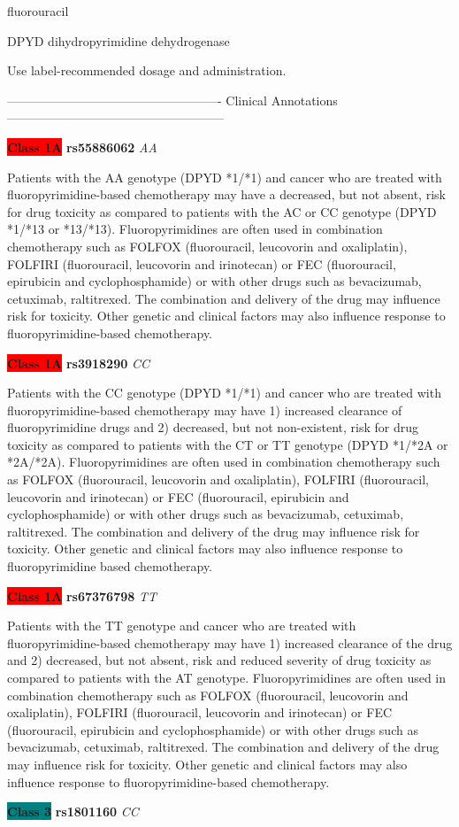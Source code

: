 \documentclass{resume} %
\begin{document}
\begin{rSection}{ fluorouracil }
\begin{rSubsection}{ DPYD }{ dihydropyrimidine dehydrogenase }{}{}
\item[] Use label-recommended dosage and administration.
\item[] ---------------------------------------------------- Clinical Annotations -----------------------------------------------------\newline
\item \textbf{\colorbox{red} {Class 1A}} \textbf{ rs55886062 } \textit{ AA }
\item[] Patients with the AA genotype (DPYD *1/*1) and cancer who are treated with fluoropyrimidine-based chemotherapy may have a decreased, but not absent, risk for drug toxicity as compared to patients with the AC or CC genotype (DPYD *1/*13 or *13/*13). Fluoropyrimidines are often used in combination chemotherapy such as FOLFOX (fluorouracil, leucovorin and oxaliplatin), FOLFIRI (fluorouracil, leucovorin and irinotecan) or FEC (fluorouracil, epirubicin and cyclophosphamide) or with other drugs such as bevacizumab, cetuximab, raltitrexed. The combination and delivery of the drug may influence risk for toxicity. Other genetic and clinical factors may also influence response to fluoropyrimidine-based chemotherapy.\item \textbf{\colorbox{red} {Class 1A}} \textbf{ rs3918290 } \textit{ CC }
\item[] Patients with the CC genotype (DPYD *1/*1) and cancer who are treated with fluoropyrimidine-based chemotherapy may have 1) increased clearance of fluoropyrimidine drugs and 2) decreased, but not non-existent, risk for drug toxicity as compared to patients with the CT or TT genotype (DPYD *1/*2A or *2A/*2A). Fluoropyrimidines are often used in combination chemotherapy such as FOLFOX (fluorouracil, leucovorin and oxaliplatin), FOLFIRI (fluorouracil,  leucovorin and irinotecan) or FEC (fluorouracil, epirubicin and cyclophosphamide) or with other drugs such as bevacizumab, cetuximab, raltitrexed. The combination and delivery of the drug may influence risk for toxicity. Other genetic and clinical factors may also influence response to fluoropyrimidine based chemotherapy.\item \textbf{\colorbox{red} {Class 1A}} \textbf{ rs67376798 } \textit{ TT }
\item[] Patients with the TT genotype and cancer who are treated with fluoropyrimidine-based chemotherapy may have 1) increased clearance of the drug and 2) decreased, but not absent, risk and reduced severity of drug toxicity as compared to patients with the AT genotype. Fluoropyrimidines are often used in combination chemotherapy such as FOLFOX (fluorouracil, leucovorin and oxaliplatin), FOLFIRI (fluorouracil, leucovorin and irinotecan) or FEC (fluorouracil, epirubicin and cyclophosphamide) or with other drugs such as bevacizumab, cetuximab, raltitrexed. The combination and delivery of the drug may influence risk for toxicity. Other genetic and clinical factors may also influence response to fluoropyrimidine-based chemotherapy.\item \textbf{\colorbox{teal} {Class 3}} \textbf{ rs1801160 } \textit{ CC }

\end{rSubsection}
\end{rSection}
\end{document}
